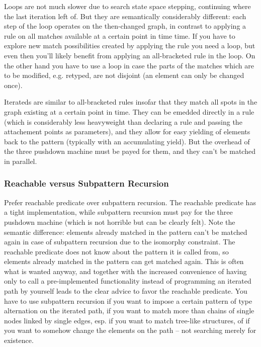 Loops are not much slower due to search state space stepping, continuing where the last iteration left of.
But they are semantically considerably different: each step of the loop operates on the then-changed graph, in contrast to applying a rule on all matches available at a certain point in time time.
If you have to explore new match possibilities created by applying the rule you need a loop, but even then you'll likely benefit from applying an all-bracketed rule in the loop.
On the other hand you have to use a loop in case the parts of the matches which are to be modified, e.g. retyped, are not disjoint (an element can only be changed once).

Iterateds are similar to all-bracketed rules insofar that they match all spots in the graph existing at a certain point in time.
They can be emedded directly in a rule (which is considerably less heavyweight than declaring a rule and passing the attachement points as parameters), and they allow for easy yielding of elements back to the pattern (typically with an accumulating yield).
But the overhead of the three pushdown machine must be payed for them, and they can't be matched in parallel.

\subsubsection*{Reachable versus Subpattern Recursion}
Prefer reachable predicate over subpattern recursion.
The reachable predicate has a tight implementation, while subpattern recursion must pay for the three pushdown machine (which is not horrible but can be clearly felt).
Note the semantic difference: elements already matched in the pattern can't be matched again in case of subpattern recursion due to the isomorphy constraint. 
The reachable predicate does not know about the pattern it is called from, so elements already matched in the pattern can get matched again.
This is often what is wanted anyway, and together with the increased convenience of having only to call a pre-implemented functionality instead of programming an iterated path by yourself leads to the clear advice to favor the reachable predicate.
You have to use subpattern recursion if you want to impose a certain pattern of type alternation on the iterated path, 
if you want to match more than chains of single nodes linked by single edges, esp. if you want to match tree-like structures,
of if you want to somehow change the elements on the path -- not searching merely for existence.

